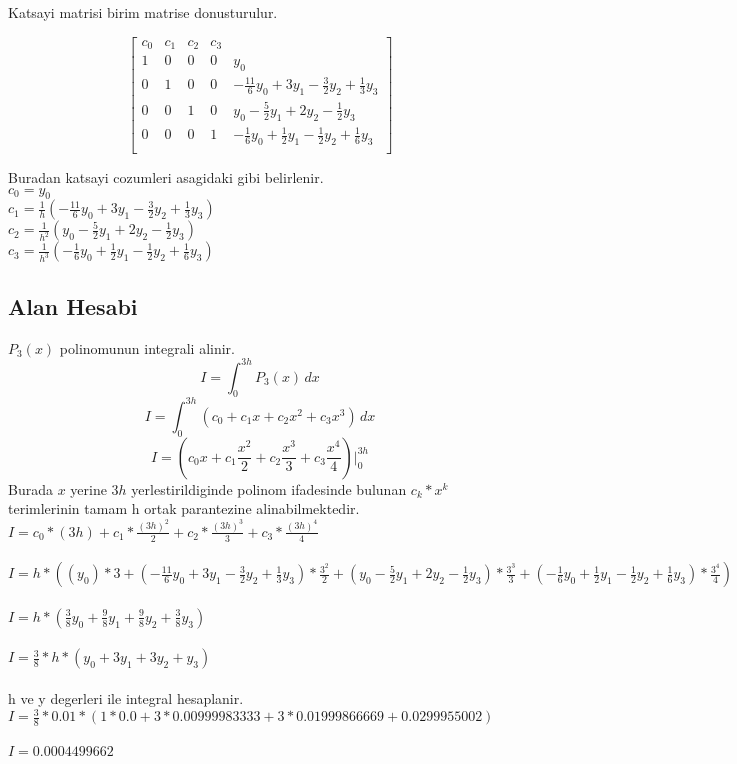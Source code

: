 \documentclass{article}
\begin{document}
Katsayi matrisi birim matrise donusturulur.
\begin{center}
$$ \left[\begin{array}{rrrr|r}
c_{0} & c_{1} & c_{2} & c_{3}\\
1 & 0 & 0 & 0 & y_{0}\\
0 & 1 & 0 & 0 & -\frac{11}{6}y_{0}+3y_{1}-\frac{3}{2}y_{2}+\frac{1}{3}y_{3}\\
0 & 0 & 1 & 0 & y_{0}-\frac{5}{2}y_{1}+2y_{2}-\frac{1}{2}y_{3}\\
0 & 0 & 0 & 1 & -\frac{1}{6}y_{0}+\frac{1}{2}y_{1}-\frac{1}{2}y_{2}+\frac{1}{6}y_{3}\\
\end{array}\right] $$
\end{center}
Buradan katsayi cozumleri asagidaki gibi belirlenir.\\
$\displaystyle c_{0}=y_{0}$\\
$\displaystyle c_{1}=\frac{1}{h}(-\frac{11}{6}y_{0}+3y_{1}-\frac{3}{2}y_{2}+\frac{1}{3}y_{3})$\\
$\displaystyle c_{2}=\frac{1}{h^{2}}(y_{0}-\frac{5}{2}y_{1}+2y_{2}-\frac{1}{2}y_{3})$\\
$\displaystyle c_{3}=\frac{1}{h^{3}}(-\frac{1}{6}y_{0}+\frac{1}{2}y_{1}-\frac{1}{2}y_{2}+\frac{1}{6}y_{3})$\\
\subsection{Alan Hesabi}
$P_{3}(x)$ polinomunun integrali alinir.\\
\[ I=\int_{0}^{3h} P_{3}(x) \,dx \]
\[ I=\int_{0}^{3h} (c_{0}+c_{1}x+c_{2}x^{2}+c_{3}x^{3}) \,dx \]
\[ I=(c_{0}x+c_{1}\frac{x^{2}}{2}+c_{2}\frac{x^{3}}{3}+c_{3}\frac{x^{4}}{4})\bigg\vert_{0}^{3h} \]
Burada $x$ yerine $3h$ yerlestirildiginde polinom ifadesinde bulunan $c_{k}*x^{k}$ terimlerinin tamam h ortak parantezine alinabilmektedir.\\
$\displaystyle I=c_{0}*(3h)+c_{1}*\frac{(3h)^{2}}{2}+c_{2}*\frac{(3h)^{3}}{3}+c_{3}*\frac{(3h)^{4}}{4}$\\\\
$\displaystyle I=h*((y_{0})*3+(-\frac{11}{6}y_{0}+3y_{1}-\frac{3}{2}y_{2}+\frac{1}{3}y_{3})*\frac{3^{2}}{2}+(y_{0}-\frac{5}{2}y_{1}+2y_{2}-\frac{1}{2}y_{3})*\frac{3^{3}}{3}+(-\frac{1}{6}y_{0}+\frac{1}{2}y_{1}-\frac{1}{2}y_{2}+\frac{1}{6}y_{3})*\frac{3^{4}}{4})$\\\\
$\displaystyle I=h*(\frac{3}{8}y_{0}+\frac{9}{8}y_{1}+\frac{9}{8}y_{2}+\frac{3}{8}y_{3})$\\\\
$\displaystyle I=\frac{3}{8}*h*(y_{0}+3y_{1}+3y_{2}+y_{3})$\\\\
h ve y degerleri ile integral hesaplanir.\\
$\displaystyle I=\frac{3}{8}*0.01*(1*0.0+3*0.00999983333+3*0.01999866669+0.0299955002)$\\\\
$\displaystyle I=0.0004499662$\\\\
\end{document}
